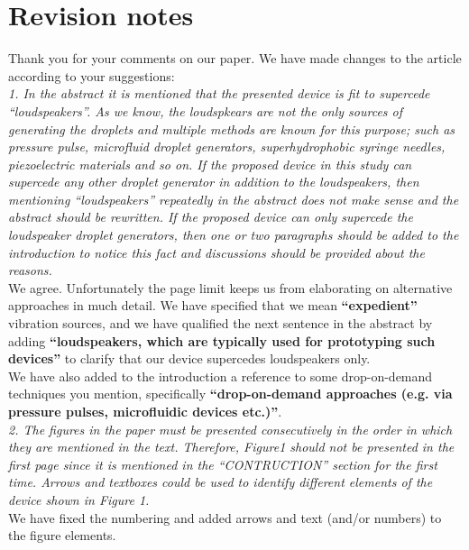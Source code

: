 \documentclass[]{article} %
\begin{document}
\section*{Revision notes}

Thank you for your comments on our paper. We have made changes to the article
according to your suggestions:\\[2ex]

\textit{1. In the abstract it is mentioned that the presented device is fit to supercede
“loudspeakers”. As we know, the loudspkears are not the only sources of
generating the droplets and multiple methods are known for this purpose; such as
pressure pulse, microfluid droplet generators, superhydrophobic syringe needles,
piezoelectric materials and so on. If the proposed device in this study can
supercede any other droplet generator in addition to the loudspeakers, then
mentioning “loudspeakers” repeatedly in the abstract does not make sense and the
abstract should be rewritten. If the proposed device can only supercede the
loudspeaker droplet generators, then one or two paragraphs should be added to
the introduction to notice this fact and discussions should be provided about
the reasons.}\\[2ex]

We agree. Unfortunately the page limit keeps us from elaborating on alternative
approaches in much detail. We have specified that we mean \textbf{``expedient''}
vibration sources, and we have qualified the next sentence in the abstract by adding
\textbf{``loudspeakers, which are typically used for prototyping such devices''}
to clarify that our device supercedes loudspeakers only.\\[2ex]

We have also added to the introduction a reference to some drop-on-demand
techniques you mention, specifically \textbf{``drop-on-demand approaches (e.g.
via pressure pulses, microfluidic devices etc.)''}. \\[2ex]

\textit{2. The figures in the paper must be presented consecutively in the order
        in which they are mentioned in the text. Therefore, Figure1 should not
        be presented in the first page since it is mentioned in the
        “CONTRUCTION” section for the first time. Arrows and textboxes could be
used to identify different elements of the device shown in Figure 1.}\\[2ex]

We have fixed the numbering and added arrows and text (and/or numbers) to the
figure elements.\\[2ex]
\end{document}
